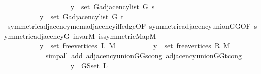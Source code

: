 \begin{isabellebody}
\ \ \ \ \ \ \ \ \isamarkupfalse%
\isanewline
\ \ \ \ \ \ \ \ \ \ {\isachardoublequoteopen}y\ {\isasymin}\ set\ {\isacharparenleft}{\kern0pt}G{\isachardot}{\kern0pt}adjacency{\isacharunderscore}{\kern0pt}list\ {\isacharquery}{\kern0pt}G\ s{\isacharparenright}{\kern0pt}{\isachardoublequoteclose}\isanewline
\ \ \ \ \ \ \ \ \ \ {\isachardoublequoteopen}y\ {\isasymin}\ set\ {\isacharparenleft}{\kern0pt}G{\isachardot}{\kern0pt}adjacency{\isacharunderscore}{\kern0pt}list\ {\isacharquery}{\kern0pt}G\ t{\isacharparenright}{\kern0pt}{\isachardoublequoteclose}\isanewline
\ \ \ \ \ \ \ \ \ \ \isamarkupfalse%
\ symmetric{\isacharunderscore}{\kern0pt}adjacency{\isachardot}{\kern0pt}mem{\isacharunderscore}{\kern0pt}adjacency{\isacharunderscore}{\kern0pt}iff{\isacharunderscore}{\kern0pt}edge{\isacharbrackleft}{\kern0pt}OF\ symmetric{\isacharunderscore}{\kern0pt}adjacency{\isacharunderscore}{\kern0pt}union{\isacharunderscore}{\kern0pt}G{}{\isacharunderscore}{\kern0pt}G{}{\isacharbrackleft}{\kern0pt}OF\ symmetric{\isacharunderscore}{\kern0pt}adjacency{\isacharunderscore}{\kern0pt}G\ invar{\isacharunderscore}{\kern0pt}M\ is{\isacharunderscore}{\kern0pt}symmetric{\isacharunderscore}{\kern0pt}Map{\isacharunderscore}{\kern0pt}M{\isacharbrackright}{\kern0pt}{\isacharbrackright}{\kern0pt}\isanewline
\ \ \ \ \ \ \ \ \ \ \isacommand{{\isachardot}{\kern0pt}}\isamarkupfalse%
\isanewline
\ \ \ \ \ \ \ \ \isamarkupfalse%
\isanewline
\ \ \ \ \ \ \ \ \ \ {\isachardoublequoteopen}y\ {\isasymin}\ set\ {\isacharparenleft}{\kern0pt}free{\isacharunderscore}{\kern0pt}vertices\ L\ M{\isacharparenright}{\kern0pt}{\isachardoublequoteclose}\isanewline
\ \ \ \ \ \ \ \ \ \ {\isachardoublequoteopen}y\ {\isasymin}\ set\ {\isacharparenleft}{\kern0pt}free{\isacharunderscore}{\kern0pt}vertices\ R\ M{\isacharparenright}{\kern0pt}{\isachardoublequoteclose}\isanewline
\ \ \ \ \ \ \ \ \ \ \isamarkupfalse%
\ {\isacharparenleft}{\kern0pt}simp{\isacharunderscore}{\kern0pt}all\ add{\isacharcolon}{\kern0pt}\ adjacency{\isacharunderscore}{\kern0pt}union{\isacharunderscore}{\kern0pt}G{}{\isacharunderscore}{\kern0pt}G{}{\isacharunderscore}{\kern0pt}s{\isacharunderscore}{\kern0pt}cong\ adjacency{\isacharunderscore}{\kern0pt}union{\isacharunderscore}{\kern0pt}G{}{\isacharunderscore}{\kern0pt}G{}{\isacharunderscore}{\kern0pt}t{\isacharunderscore}{\kern0pt}cong{\isacharparenright}{\kern0pt}\isanewline
\ \ \ \ \ \ \ \ \isamarkupfalse%
\isanewline
\ \ \ \ \ \ \ \ \ \ {\isachardoublequoteopen}y\ {\isasymin}\ G{\isachardot}{\kern0pt}S{\isachardot}{\kern0pt}set\ L{\isachardoublequoteclose}\isanewline

\end{isabellebody}
